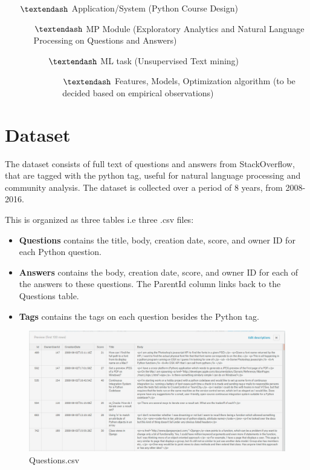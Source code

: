 \documentclass{article}
\begin{document}
\begin{itemize}
\item[$\textendash$] Application/System (Python Course Design)
\begin{itemize}
\item [$\textendash$] MP Module (Exploratory Analytics and Natural Language Processing on Questions and Answers)
\begin{itemize}
\item[$\textendash$] ML task (Unsupervised Text mining)
\begin{itemize}
\item[$\textendash$] Features, Models, Optimization algorithm (to be decided based on empirical observations)
\end{itemize}
\end{itemize}
\end{itemize}
\end{itemize}

\newpage
\section{Dataset}
The dataset consists of full text of questions and answers from StackOverflow, that are tagged with the python tag, useful for natural language processing and community analysis. The dataset is collected over a period of 8 years, from 2008-2016. 
\par
This is organized as three tables i.e three .csv files:

\begin{itemize}
\item \textbf{Questions} contains the title, body, creation date, score, and owner ID for each Python question.

\item \textbf{Answers}  contains the body, creation date, score, and owner ID for each of the answers to these questions. The ParentId column links back to the Questions table.

\item \textbf{Tags} contains the tags on each question besides the Python tag.
\end{itemize}

\newpage

\begin{figure}[h]
\centering
\includegraphics[width=14cm]{Questions}
\caption {Questions.csv}
\end{figure}
\end{document}
